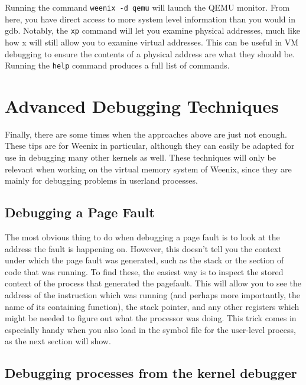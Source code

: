 Running the command \texttt{weenix -d qemu} will launch the QEMU monitor. From here, you have direct access to more system level information than you would in gdb. Notably, the \texttt{xp} command will let you examine physical addresses, much like how x will still allow you to examine virtual addresses. This can be useful in VM debugging to ensure the contents of a physical address are what they should be. Running the \texttt{help} command produces a full list of commands.

\section{Advanced Debugging Techniques}
Finally, there are some times when the approaches above are just not enough. These tips are for Weenix in particular, although they can easily be adapted for use in debugging many other kernels as well. These techniques will only be relevant when working on the virtual memory system of Weenix, since they are mainly for debugging problems in userland processes.

\subsection{Debugging a Page Fault}

The most obvious thing to do when debugging a page fault is to look at the address the fault is happening on. However, this doesn't tell you the context under which the page fault was generated, such as the stack or the section of code that was running. To find these, the easiest way is to inspect the stored context of the process that generated the pagefault. This will allow you to see the address of the instruction which was running (and perhaps more importantly, the name of its containing function), the stack pointer, and any other registers which might be needed to figure out what the processor was doing. This trick comes in especially handy when you also load in the symbol file for the user-level process, as the next section will show.

\subsection{Debugging processes from the kernel debugger}

